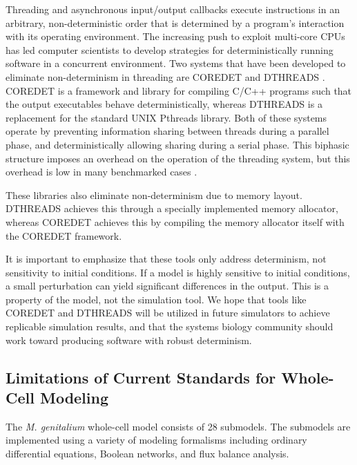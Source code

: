 \documentclass[journal,transmag,twoside]{IEEEtran}
\begin{document}
Threading and asynchronous input/output callbacks execute instructions in an arbitrary,
non-deterministic order that is determined by a program's interaction with 
its operating environment. The increasing push to exploit multi-core CPUs has
led computer scientists to develop strategies for deterministically running software 
in a concurrent environment. Two systems that have been developed to eliminate non-determinism in threading
are C{\small ORE}D{\small ET} \cite{bergan2010coredet} and D{\small THREADS} \cite{liu2011dthreads}.
C{\small ORE}D{\small ET} is a framework and library for compiling C/C++ programs
such that the output executables behave deterministically, whereas
D{\small THREADS} is a replacement for the standard UNIX Pthreads library.
Both of these systems operate by preventing information sharing between
threads during a parallel phase, and deterministically allowing sharing
during a serial phase.
This biphasic structure imposes an overhead on the operation of the threading
system, but this overhead is low in many benchmarked cases \cite{liu2011dthreads}. 

These libraries also eliminate non-determinism
due to memory layout. D{\small THREADS} achieves this through a specially implemented memory allocator,
whereas C{\small ORE}D{\small ET} achieves this by compiling the
memory allocator itself with the C{\small ORE}D{\small ET} framework.

It is important to emphasize that these tools only address determinism, not sensitivity to initial conditions.
If a model is highly sensitive to initial conditions, a small perturbation can yield significant differences in the output. This is a property of the model, not the simulation tool.
We hope that tools like C{\small ORE}D{\small ET} and D{\small THREADS} will be utilized in future simulators
to achieve replicable simulation results, and that the systems biology community should
work toward producing software with robust determinism.

\subsection{Limitations of Current Standards for Whole-Cell Modeling}

The \textit{M. genitalium} whole-cell model \cite{Karr2012} consists of 28 submodels.
The submodels are implemented using a variety of modeling formalisms including
ordinary differential equations, Boolean networks, and flux balance analysis.
\end{document}
